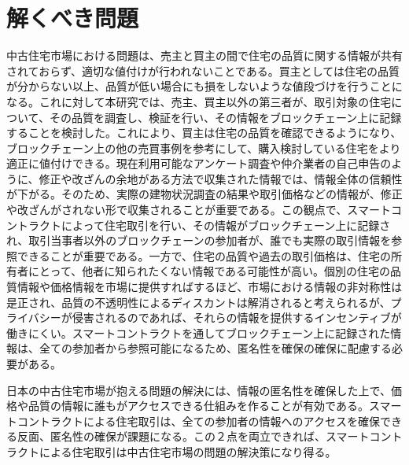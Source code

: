 \documentclass[a4paper,fontsize=11pt,report,notitlepage,line_length=38zw,number_of_lines=40,dvipdfmx]{jlreq}
\begin{document}
\section{解くべき問題}
中古住宅市場における問題は、売主と買主の間で住宅の品質に関する情報が共有されておらず、適切な値付けが行われないことである。買主としては住宅の品質が分からない以上、品質が低い場合にも損をしないような値段づけを行うことになる。これに対して本研究では、売主、買主以外の第三者が、取引対象の住宅について、その品質を調査し、検証を行い、その情報をブロックチェーン上に記録することを検討した。これにより、買主は住宅の品質を確認できるようになり、ブロックチェーン上の他の売買事例を参考にして、購入検討している住宅をより適正に値付けできる。現在利用可能なアンケート調査や仲介業者の自己申告のように、修正や改ざんの余地がある方法で収集された情報では、情報全体の信頼性が下がる。そのため、実際の建物状況調査の結果や取引価格などの情報が、修正や改ざんがされない形で収集されることが重要である。この観点で、スマートコントラクトによって住宅取引を行い、その情報がブロックチェーン上に記録され、取引当事者以外のブロックチェーンの参加者が、誰でも実際の取引情報を参照できることが重要である。一方で、住宅の品質や過去の取引価格は、住宅の所有者にとって、他者に知られたくない情報である可能性が高い。個別の住宅の品質情報や価格情報を市場に提供すればするほど、市場における情報の非対称性は是正され、品質の不透明性によるディスカントは解消されると考えられるが、プライバシーが侵害されるのであれば、それらの情報を提供するインセンティブが働きにくい。スマートコントラクトを通してブロックチェーン上に記録された情報は、全ての参加者から参照可能になるため、匿名性を確保の確保に配慮する必要がある。

日本の中古住宅市場が抱える問題の解決には、情報の匿名性を確保した上で、価格や品質の情報に誰もがアクセスできる仕組みを作ることが有効である。スマートコントラクトによる住宅取引は、全ての参加者の情報へのアクセスを確保できる反面、匿名性の確保が課題になる。この２点を両立できれば、スマートコントラクトによる住宅取引は中古住宅市場の問題の解決策になり得る。
\end{document}
